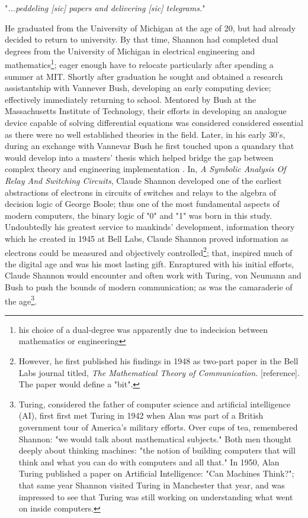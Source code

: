 \documentclass[7pt]{article}
\begin{document}
\vspace{0.00in}
\centerline{"\emph{...peddeling [sic] papers and delivering [sic] telegrams.}"}
\vspace{0.100in} He graduated from the University of Michigan at the age of 20, but had already decided to return to university. By that time, Shannon had completed dual degrees from the University of Michigan in electrical engineering and mathematics\footnote{his choice of a dual-degree was apparently due to indecision between  mathematics or engineering}; eager enough have to relocate particularly after spending a summer at MIT.  Shortly after graduation he sought and obtained a research assistantship with Vannever Bush, developing an early computing device; effectively immediately returning to school. Mentored by Bush at the Massachusetts Institute of Technology, their efforts in developing  an analogue device capable of solving differential equations was considered considered essential as there were no well established theories in the field. Later, in his early 30's, during an exchange with Vannevar Bush he first touched upon a quandary that would develop into a masters' thesis which helped bridge the gap between complex theory and engineering implementation . In, \emph{A Symbolic Analysis Of Relay And Switching Circuits}, Claude Shannon developed one of the earliest abstractions of electrons in circuits of switches and relays to the algebra of decision logic of George Boole; thus one of the most fundamental aspects of modern computers, the binary logic of "0" and "1" was born in this study.  Undoubtedly his greatest service to mankinds' development, {information theory} which he created in 1945 at Bell Labs, Claude Shannon proved information as electrons could be measured and objectively controlled\footnote{However, he first published his findings in 1948 as two-part paper in the Bell Labs journal titled,  \emph{The Mathematical Theory of Communication.} [reference]. The paper would define a "bit". }; that, inspired much of the digital age and was his most lasting gift. Enraptured with his initial efforts, Claude 
Shannon would encounter and often work with Turing, von Neumann and Bush to push the bounds of modern communication; as was the camaraderie of the age\footnote{Turing,  considered  the father of  computer science and artificial intelligence (AI), first  
 first met Turing in 1942 when Alan was part of a British government tour of America's military efforts. Over  cups of tea, remembered Shannon: "we would talk about mathematical subjects." Both men thought deeply about thinking machines: "the notion of building computers that will think and what you can do with computers and all that."  In 1950, Alan  Turing published a paper on Artificial Intelligence: "Can Machines Think?"; that same year Shannon visited Turing in Manchester that year, and was impressed to see that Turing was still working on understanding what went on inside computers.}.
    
\end{document}
